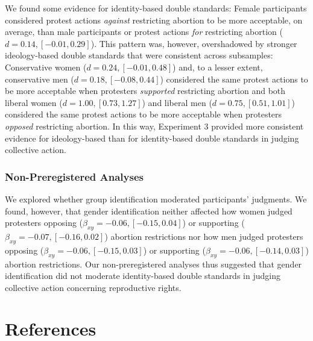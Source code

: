 \documentclass[12pt, letterpaper]{article}
\begin{document}
We found some evidence for identity-based double standards: Female
participants considered protest actions \emph{against} restricting
abortion to be more acceptable, on average, than male participants or
protest actions \emph{for} restricting abortion
(\(d = 0.14, [-0.01, 0.29]\)). This pattern was, however, overshadowed
by stronger ideology-based double standards that were consistent across
subsamples: Conservative women (\(d = 0.24, [-0.01, 0.48]\)) and, to a
lesser extent, conservative men (\(d = 0.18, [-0.08, 0.44]\)) considered
the same protest actions to be more acceptable when protesters
\emph{supported} restricting abortion and both liberal women
(\(d = 1.00, [0.73, 1.27]\)) and liberal men
(\(d = 0.75, [0.51, 1.01]\)) considered the same protest actions to be
more acceptable when protesters \emph{opposed} restricting abortion. In
this way, Experiment 3 provided more consistent evidence for
ideology-based than for identity-based double standards in judging
collective action.

\hypertarget{non-preregistered-analyses-1}{%
\subsubsection{Non-Preregistered
Analyses}\label{non-preregistered-analyses-1}}

We explored whether group identification moderated participants'
judgments. We found, however, that gender identification neither
affected how women judged protesters opposing
(\(\beta_{xy} = -0.06, [-0.15, 0.04]\)) or supporting
(\(\beta_{xy} = -0.07, [-0.16, 0.02]\)) abortion restrictions nor how
men judged protesters opposing (\(\beta_{xy} = -0.06, [-0.15, 0.03]\))
or supporting (\(\beta_{xy} = -0.06, [-0.14, 0.03]\)) abortion
restrictions. Our non-preregistered analyses thus suggested that gender
identification did not moderate identity-based double standards in
judging collective action concerning reproductive rights.

\newpage

\hypertarget{references}{%
\section{References}\label{references}}

\begingroup

\noindent \setlength{\parindent}{-0.5in} \setlength{\leftskip}{0.5in}
\end{document}
